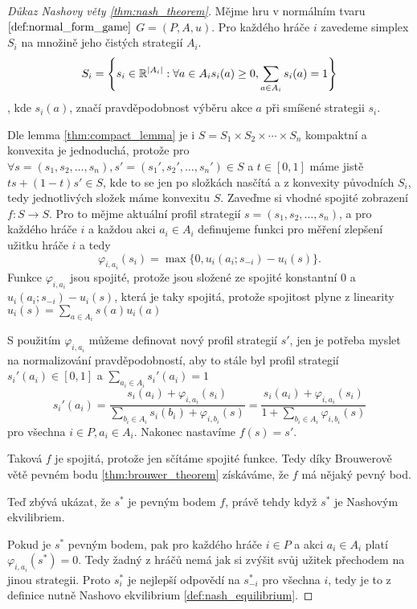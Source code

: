 \begin{proof}[Důkaz Nashovy věty \ref{thm:nash_theorem}]
Mějme hru v normálním tvaru $\ref{def:normal_form_game}$ $G = (P, A, u)$. 
Pro každého hráče $i$ zavedeme simplex $S_i$ na množině jeho čistých strategií $A_i$. 
\[
    S_i = \left\{ s_i \in \mathbb{R}^{\left|A_i\right|}: \forall a \in A_i s_i(a) \geq 0, \sum_{a \in A_i} s_i(a) = 1 \right\}
\],
kde $s_i(a)$, značí pravděpodobnost výběru akce $a$ při smíšené strategii $s_i$. 

Dle lemma \ref{thm:compact_lemma} je i $S = S_1 \times S_2 \times \cdots \times S_n$ kompaktní a konvexita je jednoduchá, protože pro $\forall s =(s_1, s_2, \dots, s_n), s' =(s_1', s_2', \dots, s_n') \in S$ a $t \in [0,1]$ máme jistě $ts + (1-t)s' \in S$, kde to se jen po složkách nasčítá a z konvexity původních $S_i$, tedy jednotlivých složek máme konvexitu $S$. 
Zaveďme si vhodné spojité zobrazení $f: S \rightarrow S$. 
Pro to mějme aktuální profil strategií $s =(s_1, s_2, \dots, s_n)$, a pro každého hráče $i$ a každou akci $a_i \in A_i$ definujeme funkci pro měření zlepšení užitku hráče $i$ a tedy 
\[
    \varphi_{i,a_i}(s_i) = \max\{0,u_i(a_i; s_{-i}) - u_i(s) \}.
\]
Funkce $\varphi_{i,a_i}$ jsou spojité, protože jsou složené ze spojité konstantní $0$ a $u_i(a_i;s_{-i}) - u_i(s)$, která je taky spojitá, protože spojitost plyne z linearity $u_i(s) = \sum_{a \in A_i} s(a) u_i(a)$

S použitím $\varphi_{i,a_i}$ můžeme definovat nový profil strategií $s'$, jen je potřeba myslet na normalizování pravděpodobností, aby to stále byl profil strategií $s_i'(a_i) \in [0,1]$ a $\sum_{a_i \in A_i} s_i'(a_i) = 1$
\[
    s_i'(a_i) = \frac{s_i(a_i) + \varphi_{i,a_i}(s_i)}{\sum_{b_i \in A_i} s_i(b_i) + \varphi_{i,b_i}(s)} = \frac{s_i(a_i) + \varphi_{i,a_i}(s_i)}{1 + \sum_{b_i \in A_i} \varphi_{i,b_i}(s)}
\]
pro všechna $i \in P, a_i \in A_i$. Nakonec nastavíme $f(s) = s'$. 

Taková $f$ je spojitá, protože jen sčítáme spojité funkce. Tedy díky Brouwerově větě pevném bodu \ref{thm:brouwer_theorem} získáváme, že $f$ má nějaký pevný bod. 

Teď zbývá ukázat, že $s^*$ je pevným bodem $f$, právě tehdy když $s^*$ je Nashovým ekvilibriem. 

Pokud je $s^*$ pevným bodem, pak pro každého hráče $i \in P$ a akci $a_i \in A_i$ platí $\varphi_{i,a_i}(s^*) = 0$. Tedy žadný z hráčů nemá jak si zvýšit svůj užitek přechodem na jinou strategii. 
Proto $s_i^{*}$ je nejlepší odpovědí na $s_{-i}^{*}$ pro všechna $i$, tedy je to z definice nutně Nashovo ekvilibrium \ref{def:nash_equilibrium}.
\end{proof}
